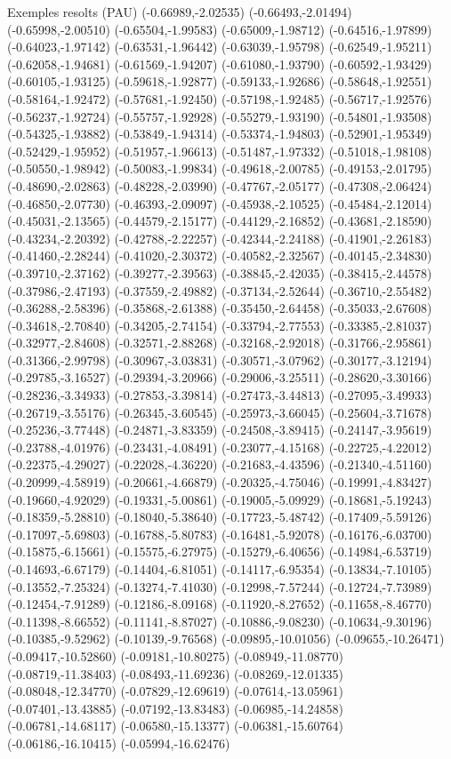 \documentclass[11pt,a4paper]{article}
\begin{document}
\begin{fmex}{Exemples resolts (PAU)}
(-0.66989,-2.02535) (-0.66493,-2.01494) (-0.65998,-2.00510) (-0.65504,-1.99583) (-0.65009,-1.98712) (-0.64516,-1.97899) (-0.64023,-1.97142) (-0.63531,-1.96442) (-0.63039,-1.95798) (-0.62549,-1.95211) (-0.62058,-1.94681) (-0.61569,-1.94207) (-0.61080,-1.93790) (-0.60592,-1.93429) (-0.60105,-1.93125) (-0.59618,-1.92877) (-0.59133,-1.92686) (-0.58648,-1.92551) (-0.58164,-1.92472) (-0.57681,-1.92450) (-0.57198,-1.92485) (-0.56717,-1.92576) (-0.56237,-1.92724) (-0.55757,-1.92928) (-0.55279,-1.93190) (-0.54801,-1.93508) (-0.54325,-1.93882) (-0.53849,-1.94314) (-0.53374,-1.94803) (-0.52901,-1.95349) (-0.52429,-1.95952) (-0.51957,-1.96613) (-0.51487,-1.97332) (-0.51018,-1.98108) (-0.50550,-1.98942) (-0.50083,-1.99834) (-0.49618,-2.00785) (-0.49153,-2.01795) (-0.48690,-2.02863) (-0.48228,-2.03990) (-0.47767,-2.05177) (-0.47308,-2.06424) (-0.46850,-2.07730) (-0.46393,-2.09097) (-0.45938,-2.10525) (-0.45484,-2.12014) (-0.45031,-2.13565) (-0.44579,-2.15177) (-0.44129,-2.16852) (-0.43681,-2.18590) (-0.43234,-2.20392) (-0.42788,-2.22257) (-0.42344,-2.24188) (-0.41901,-2.26183) (-0.41460,-2.28244) (-0.41020,-2.30372) (-0.40582,-2.32567) (-0.40145,-2.34830) (-0.39710,-2.37162) (-0.39277,-2.39563) (-0.38845,-2.42035) (-0.38415,-2.44578) (-0.37986,-2.47193) (-0.37559,-2.49882) (-0.37134,-2.52644) (-0.36710,-2.55482) (-0.36288,-2.58396) (-0.35868,-2.61388) (-0.35450,-2.64458) (-0.35033,-2.67608) (-0.34618,-2.70840) (-0.34205,-2.74154) (-0.33794,-2.77553) (-0.33385,-2.81037) (-0.32977,-2.84608) (-0.32571,-2.88268) (-0.32168,-2.92018) (-0.31766,-2.95861) (-0.31366,-2.99798) (-0.30967,-3.03831) (-0.30571,-3.07962) (-0.30177,-3.12194) (-0.29785,-3.16527) (-0.29394,-3.20966) (-0.29006,-3.25511) (-0.28620,-3.30166) (-0.28236,-3.34933) (-0.27853,-3.39814) (-0.27473,-3.44813) (-0.27095,-3.49933) (-0.26719,-3.55176) (-0.26345,-3.60545) (-0.25973,-3.66045) (-0.25604,-3.71678) (-0.25236,-3.77448) (-0.24871,-3.83359) (-0.24508,-3.89415) (-0.24147,-3.95619) (-0.23788,-4.01976) (-0.23431,-4.08491) (-0.23077,-4.15168) (-0.22725,-4.22012) (-0.22375,-4.29027) (-0.22028,-4.36220) (-0.21683,-4.43596) (-0.21340,-4.51160) (-0.20999,-4.58919) (-0.20661,-4.66879) (-0.20325,-4.75046) (-0.19991,-4.83427) (-0.19660,-4.92029) (-0.19331,-5.00861) (-0.19005,-5.09929) (-0.18681,-5.19243) (-0.18359,-5.28810) (-0.18040,-5.38640) (-0.17723,-5.48742) (-0.17409,-5.59126) (-0.17097,-5.69803) (-0.16788,-5.80783) (-0.16481,-5.92078) (-0.16176,-6.03700) (-0.15875,-6.15661) (-0.15575,-6.27975) (-0.15279,-6.40656) (-0.14984,-6.53719) (-0.14693,-6.67179) (-0.14404,-6.81051) (-0.14117,-6.95354) (-0.13834,-7.10105) (-0.13552,-7.25324) (-0.13274,-7.41030) (-0.12998,-7.57244) (-0.12724,-7.73989) (-0.12454,-7.91289) (-0.12186,-8.09168) (-0.11920,-8.27652) (-0.11658,-8.46770) (-0.11398,-8.66552) (-0.11141,-8.87027) (-0.10886,-9.08230) (-0.10634,-9.30196) (-0.10385,-9.52962) (-0.10139,-9.76568) (-0.09895,-10.01056) (-0.09655,-10.26471) (-0.09417,-10.52860) (-0.09181,-10.80275) (-0.08949,-11.08770) (-0.08719,-11.38403) (-0.08493,-11.69236) (-0.08269,-12.01335) (-0.08048,-12.34770) (-0.07829,-12.69619) (-0.07614,-13.05961) (-0.07401,-13.43885) (-0.07192,-13.83483) (-0.06985,-14.24858) (-0.06781,-14.68117) (-0.06580,-15.13377) (-0.06381,-15.60764) (-0.06186,-16.10415) (-0.05994,-16.62476) 
\end{fmex}
\end{document}
